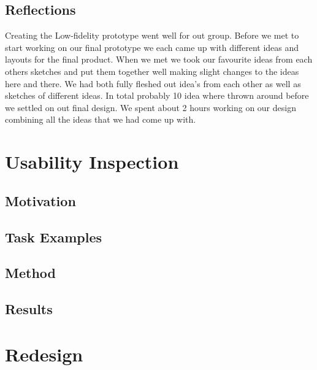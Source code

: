 \documentclass{chi2011}
\begin{document}
    \subsection{Reflections}
	Creating the Low-fidelity prototype went well for out group. Before we met
	to start working on our final prototype we each came up with different ideas
	and layouts for the final product. When we met we took our favourite ideas
	from each others sketches and put them together well making slight changes
	to the ideas here and there. We had both fully fleshed out idea's from each
	other as well as sketches of different ideas. In total probably 10 idea
	where thrown around before we settled on out final design. We spent about 2
	hours working on our design combining all the ideas that we had come up
	with.

\section{Usability Inspection}
    \subsection{Motivation}
    \subsection{Task Examples}
    \subsection{Method}
    \subsection{Results}

\section{Redesign}



\printbibliography
\end{document}
